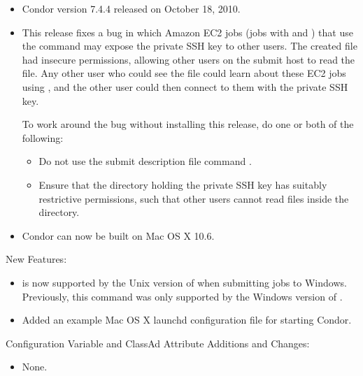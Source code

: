 \begin{itemize}

\item Condor version 7.4.4 released on October 18, 2010.

\item \Security 
This release fixes a bug in which Amazon EC2 jobs
(jobs with  and )
that use the 
command may expose the private SSH key to other users.
The created file had insecure permissions,
allowing other users on the submit host to read the file.
Any other user who could see the file could learn about these EC2 jobs
using , 
and the other user could then connect to them with the private SSH key.

To work around the bug without installing this release,
do one or both of the following:
\begin{itemize}
\item Do not use the submit description file command
.
\item Ensure that the directory holding the private SSH key 
has suitably restrictive permissions,
such that other users cannot read files inside the directory.
\end{itemize}


\item Condor can now be built on Mac OS X 10.6.

\end{itemize}


\noindent New Features:

\begin{itemize}

\item {} is now supported by the Unix version of
 when submitting jobs to Windows.  Previously, this command
was only supported by the Windows version of .

\item Added an example Mac OS X launchd configuration file for starting Condor.

\end{itemize}

\noindent Configuration Variable and ClassAd Attribute Additions and Changes:

\begin{itemize}

\item None.

\end{itemize}

